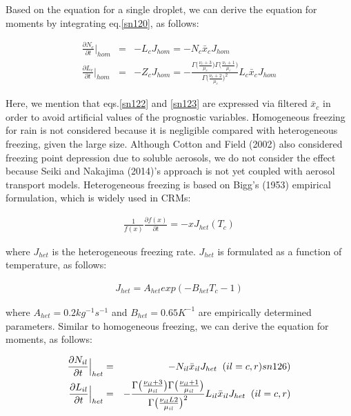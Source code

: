 Based on the equation for a single droplet, we can derive the equation for moments by integrating eq.\ref{sn120}, as follows:

\begin{eqnarray}
\frac{\partial N_{c}}{\partial t}\Bigr|_{hom}&=&-L_{c}J_{hom}=-N_{c}\bar{x}_{c}J_{hom}\label{sn122}\\
\frac{\partial L_{c}}{\partial t}\Bigr|_{hom}&=&-Z_{c}J_{hom}=-\frac{\Gamma\bigl(\frac{\nu_{c}+3}{\mu_{c}}\bigr)\Gamma\bigl(\frac{\nu_{c}+1}{\mu_{c}}\bigr)}{\Gamma\bigl(\frac{\nu_{c}+2}{\mu_{c}}\bigr)^{2}}L_{c}\bar{x}_{c}J_{hom}\label{sn123}
\end{eqnarray}

Here, we mention that eqs.\ref{sn122} and \ref{sn123} are expressed via filtered $\bar{x}_{c}$ in order to avoid artificial values of the prognostic variables. Homogeneous freezing for rain is not considered because it is negligible compared with heterogeneous freezing, given the large size. Although Cotton and Field (2002) also considered freezing point depression due to soluble aerosols, we do not consider the effect because Seiki and Nakajima (2014)’s approach is not yet coupled with aerosol transport models.
Heterogeneous freezing is based on Bigg’s (1953) empirical formulation, which is widely used in CRMs:

\begin{eqnarray}
\frac{1}{f(x)}\frac{\partial f(x)}{\partial t}=-xJ_{het}(T_{c})\label{sn124}
\end{eqnarray}

where $J_{het}$ is the heterogeneous freezing rate. $J_{het}$ is formulated as a function of temperature, as follows:

\begin{eqnarray}
J_{het}=A_{het}exp(-B_{het}T_{c}-1)\label{sn125}
\end{eqnarray}

where $A_{het}=0.2kg^{-1}s^{-1}$ and $B_{het}=0.65K^{-1}$ are empirically determined parameters. Similar to homogeneous freezing, we can derive the equation for moments, as follows:

\begin{eqnarray}
\frac{\partial N_{il}}{\partial t}\Bigr|_{het}&=&-N_{il}\bar{x}_{il}J_{het}\;\;(il=c,r)\label(sn126)\\
\frac{\partial L_{il}}{\partial t}\Bigr|_{het}&=&-\frac{\Gamma\bigl(\frac{\nu_{il}+3}{\mu_{il}}\bigr)\Gamma\bigl(\frac{\nu_{il}+1}{\mu_{il}}\bigr)}{\Gamma\bigl(\frac{\nu_{il}L2}{\mu_{il}}\bigr)^{2}}L_{il}\bar{x}_{il}J_{het}\;\;(il=c,r)\label{sn127}
\end{eqnarray}

